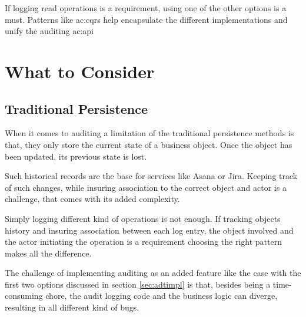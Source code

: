 If logging read operations is a requirement, using one of the other options is a must. Patterns like \gls{ac:cqrs} help encapsulate the different implementations and unify the auditing \gls{ac:api}



\section{What to Consider}

\subsection{Traditional Persistence}

When it comes to auditing a limitation of the traditional persistence methods is that, they only store the current state of a business object. Once the object has been updated, its previous state is lost. 

Such historical records are the base for services like Asana or Jira. Keeping track of such changes, while insuring association to the correct object and actor is a challenge, that comes with its added complexity.

Simply logging different kind of operations is not enough. If tracking objects history and insuring association between each log entry, the object involved and the actor initiating the operation is a requirement choosing the right pattern makes all the difference.

The challenge of implementing auditing as an added feature like the case with the first two options discussed in section \ref{sec:adtimpl} is that, besides being a time-consuming chore, the audit logging code and the business logic can diverge, resulting in all different kind of bugs.

